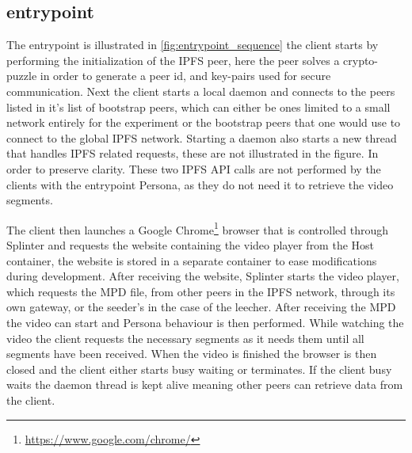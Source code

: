 

\subsection{entrypoint}
\label{sec:experiment_entrypoint}

The entrypoint is illustrated in \autoref{fig:entrypoint_sequence} the client starts by performing the initialization of the \ac{IPFS} peer, here the peer solves a crypto-puzzle in order to generate a peer id, and key-pairs used for secure communication.
Next the client starts a local daemon and connects to the peers listed in it's list of bootstrap peers, which can either be ones limited to a small network entirely for the experiment or the bootstrap peers that one would use to connect to the global \ac{IPFS} network.
Starting a daemon also starts a new thread that handles \ac{IPFS} related requests, these are not illustrated in the figure. In order to preserve clarity. These two \ac{IPFS} \ac{API} calls are not performed by the clients with the entrypoint Persona, as they do not need it to retrieve the video segments.

The client then launches a Google Chrome\footnote{\url{https://www.google.com/chrome/}} browser that is controlled through Splinter and requests the website containing the video player from the Host container, the website is stored in a separate container to ease modifications during development.
After receiving the website, Splinter starts the video player, which requests the \ac{MPD} file, from other peers in the \ac{IPFS} network, through its own gateway, or the seeder's in the case of the leecher.
After receiving the \ac{MPD} the video can start and Persona behaviour is then performed. While watching the video the client requests the necessary segments as it needs them until all segments have been received.
When the video is finished the browser is then closed and the client either starts busy waiting or terminates. If the client busy waits the daemon thread is kept alive meaning other peers can retrieve data from the client.



